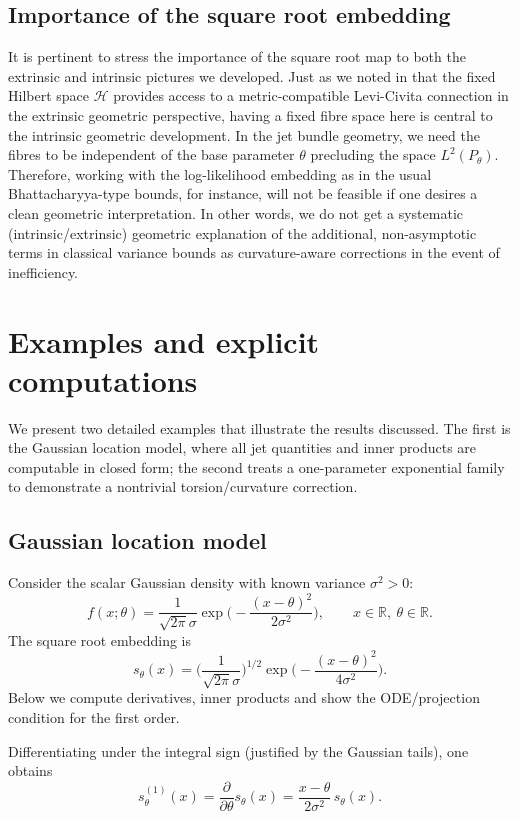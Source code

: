 \documentclass[3p,times]{elsarticle}
\begin{document}
\subsection{Importance of the square root embedding}
It is pertinent to stress the importance of the square root map to both the extrinsic and intrinsic pictures we developed. Just as we noted in \cite{SRK,srkvector} that the fixed Hilbert space \(\mathcal{H}\) provides access to a metric-compatible Levi-Civita connection in the extrinsic geometric perspective, having a fixed fibre space here is central to the intrinsic geometric development. In the jet bundle geometry, we need the fibres to be independent of the base parameter \(\theta\) precluding the space \(L^2(P_\theta)\). Therefore, working with the log-likelihood embedding as in the usual Bhattacharyya-type bounds, for instance, will not be feasible if one desires a clean geometric interpretation. In other words, we do not get a systematic (intrinsic/extrinsic) geometric explanation of the additional, non-asymptotic terms in classical variance bounds as curvature-aware corrections in the event of inefficiency.

\section{Examples and explicit computations}
\label{sec:examples}

We present two detailed examples that illustrate the results discussed.
The first is the Gaussian location model, where all jet quantities and inner products are computable in closed form;
the second treats a one-parameter exponential family to demonstrate a nontrivial torsion/curvature correction.

\subsection{Gaussian location model}
\label{sec:gauss}

Consider the scalar Gaussian density with known variance $\sigma^2>0$:
\[
f(x;\theta)=\frac{1}{\sqrt{2\pi}\sigma}\exp\!\Big(-\frac{(x-\theta)^2}{2\sigma^2}\Big),\qquad x\in\mathbb{R},\ \theta\in\mathbb{R}.
\]
The square root embedding is
\[
s_\theta(x)=\Big(\frac{1}{\sqrt{2\pi}\sigma}\Big)^{1/2}
            \exp\!\Big(-\frac{(x-\theta)^2}{4\sigma^2}\Big).
\]
Below we compute derivatives, inner products and show the ODE/projection condition for the first order.

Differentiating under the integral sign (justified by the Gaussian tails), one obtains
\[
s_\theta^{(1)}(x)=\frac{\partial}{\partial\theta}s_\theta(x)
                 =\frac{x-\theta}{2\sigma^2}\,s_\theta(x).
\]
\end{document}
